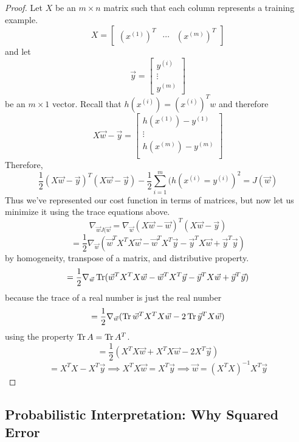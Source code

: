 \documentclass[12pt]{scrartcl}
\begin{document}
\begin{proof}
    Let $X$ be an $m \times n$ matrix such that each column represents a training example.
    \[X = \begin{bmatrix}
            (x^{(1)})^T & \cdots & (x^{(m)})^T
        \end{bmatrix}\] and let \[\vec{y} = \begin{bmatrix}
            y^{(i)} \\
            \vdots  \\
            y^{(m)}
        \end{bmatrix}\]
    be an $m \times 1$ vector. Recall that $h(x^{(i)}) = (x^{(i)})^Tw$ and
    therefore
    \[X\vec{w} - \vec{y} = \begin{bmatrix}
            h(x^{(1)}) - y^{(1)} \\
            \vdots               \\
            h(x^{(m)}) - y^{(m)} \\
        \end{bmatrix}\]
    Therefore,
    \[\frac{1}{2}(X\vec{w}-\vec{y})^T(X\vec{w} - \vec{y}) - \frac{1}{2}\sum_{i=1}^m (h(x^{(i)} = y^{(i)})^2 = J(\vec{w})\]
    Thus we've represented our cost function in terms of matrices, but now let us
    minimize it using the trace equations above.
    \[\nabla_{\vec{w}J(\vec{w}} = \nabla_{\vec{w}}(X\vec{w} - \vec{w})^T(X\vec{w} - \vec{y})\]
    \[ = \frac{1}{2}\nabla_{\vec{w}} (\vec{w}^TX^T X\vec{w} - \vec{w}^T X^T \vec{y} -\vec{y}^TX\vec{w} + \vec{y}^T\vec{y})\]
    by homogeneity, transpose of a matrix, and distributive property.
    \[= \frac{1}{2}\nabla_{\vec{w}} \operatorname{Tr} (\vec{w}^TX^T X\vec{w} - \vec{w}^T X^T \vec{y} -\vec{y}^TX\vec{w} + \vec{y}^T\vec{y})\] because the trace of a real number is just the real number
    \[= \frac{1}{2}\nabla_{\vec{w}}(\operatorname{Tr} \vec{w}^TX^TX\vec{w} - 2\operatorname{Tr}\vec{y}^TX\vec{w})\]
    using the property $\operatorname{Tr} A = \operatorname{Tr} A^T$.
    \[= \frac{1}{2}(X^TX\vec{w} + X^TX\vec{w} - 2X^T\vec{y})\]
    \[= X^TX - X^T\vec{y} \implies X^TX\vec{w} = X^T\vec{y} \implies \vec{w} = (X^TX)^{-1}X^T\vec{y}\]
\end{proof}

\subsection{Probabilistic Interpretation: Why Squared Error}
\end{document}
